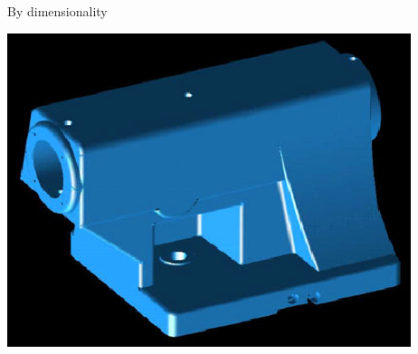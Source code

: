 \begin{frame}{By dimensionality}
\begin{itemize}
\begin{itemize}
	\includegraphics[scale=0.3]{images/CADSolid.png}
	\end{itemize}
\end{itemize}
\end{frame}

